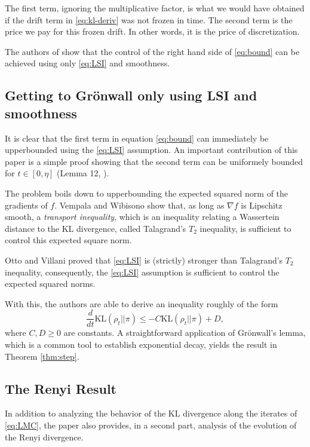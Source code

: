 \documentclass[11pt,twoside]{article}
\theoremstyle{definition}
\newcommand{\KL}{\text{KL}}
\begin{document}
The {\color{Fuchsia} first} term, ignoring the multiplicative factor, is what we would have obtained if the {\color{MidnightBlue}drift} term in \eqref{eq:kl-deriv} was not frozen in time. The {\color{Bittersweet} second} term is the price we pay for this frozen drift. In other words, it is the price of discretization.

The authors of \cite{vempala_rapid_2019} show that the control of the right hand side of \eqref{eq:bound} can be achieved using only \eqref{eq:LSI} and smoothness.

\subsection{Getting to Gr\"onwall only using LSI and smoothness}

It is clear that the {\color{Fuchsia} first} term in equation \eqref{eq:bound} can immediately be upperbounded using the \eqref{eq:LSI} assumption. An important contribution of this paper is a simple proof showing that the {\color{Bittersweet} second} term can be uniformely bounded for $t \in [0, \eta]$ (Lemma 12, \cite{vempala_rapid_2019}).

The problem boils down to upperbounding the expected squared norm of the gradients of $f$. Vempala and Wibisono show that, as long as $\nabla f$ is Lipschitz smooth, a \textit{transport inequality}, which is an inequality relating a Wassertein distance to the KL divergence, called Talagrand's $T_2$ inequality, is sufficient to control this expected square norm. 

Otto and Villani \cite{otto_generalization_2000} proved that \eqref{eq:LSI} is (strictly) stronger than Talagrand's $T_2$ inequality, consequently, the \eqref{eq:LSI} assumption is sufficient to control the expected squared norms.

With this, the authors are able to derive an inequality roughly of the form
\[
\frac{d}{dt}\KL(\rho_t || \pi) \leq -C\KL(\rho_t || \pi) + D,
\]
where $C, D \geq 0$ are constants. A straightforward application of Gr\"onwall's lemma, which is a common tool to establish exponential decay, yields the result in Theorem \ref{thm:step}.

\subsection{The Renyi Result}

In addition to analyzing the behavior of the $\KL$ divergence along the iterates of \eqref{eq:LMC}, the paper also provides, in a second part, analysis of the evolution of the Renyi divergence.
\end{document}
